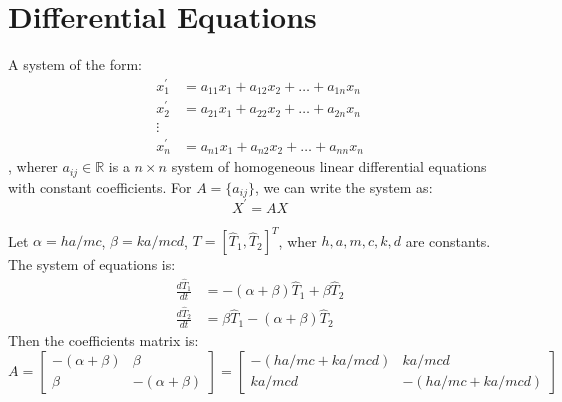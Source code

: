 \documentclass[11pt]{article}
\begin{document}
\section{Differential Equations}
\begin{definition}
    A system of the form:
    \begin{align*}
        x_1^\prime &= a_{11}x_1 + a_{12}x_2 + \ldots + a_{1n}x_n \\
        x_2^\prime &= a_{21}x_1 + a_{22}x_2 + \ldots + a_{2n}x_n \\
        \vdots \\
        x_n^\prime &= a_{n1}x_1 + a_{n2}x_2 + \ldots + a_{nn}x_n
    \end{align*}
    , wherer $a_{ij} \in \mathbb{R}$ is a $n \times n$ system of homogeneous linear differential equations with constant coefficients. For $A = \{a_{ij}\}$, we can write the system as:
    \begin{equation}
       X^\prime = AX
    \end{equation}
\end{definition}
\begin{example}
    Let $\alpha = ha/mc$, $\beta = ka/mcd$, $T = [\hat{T}_1, \hat{T}_2]^T$, wher $h, a, m, c, k, d$ are constants. The system of equations is:
    \begin{align*}
        \frac{d\hat{T}_1}{dt} &= -(\alpha+\beta)\hat{T}_1 + \beta\hat{T}_2 \\
        \frac{d\hat{T}_2}{dt} &= \beta\hat{T}_1 - (\alpha+\beta)\hat{T}_2
    \end{align*}
    Then the coefficients matrix is:
    $$
        A = \begin{bmatrix}
            -(\alpha+\beta) & \beta \\
            \beta & -(\alpha+\beta)
        \end{bmatrix} = \begin{bmatrix} 
            -(ha/mc + ka/mcd) & ka/mcd \\
            ka/mcd & -(ha/mc + ka/mcd)
        \end{bmatrix}
    $$
\end{example}
\end{document}
